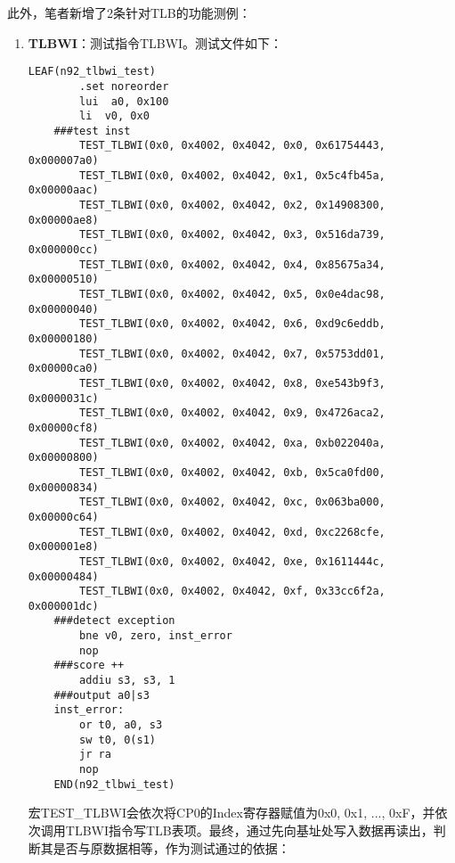 此外，笔者新增了2条针对TLB的功能测例：

\begin{enumerate}
    \item {\bf TLBWI}：测试指令TLBWI。测试文件如下：

    \begin{lstlisting}[caption={n92\_tlbwi.S}, emph={TEST\_TLBWI}]
    LEAF(n92_tlbwi_test)
        .set noreorder
        lui  a0, 0x100
        li  v0, 0x0
    ###test inst
        TEST_TLBWI(0x0, 0x4002, 0x4042, 0x0, 0x61754443, 0x000007a0)
        TEST_TLBWI(0x0, 0x4002, 0x4042, 0x1, 0x5c4fb45a, 0x00000aac)
        TEST_TLBWI(0x0, 0x4002, 0x4042, 0x2, 0x14908300, 0x00000ae8)
        TEST_TLBWI(0x0, 0x4002, 0x4042, 0x3, 0x516da739, 0x000000cc)
        TEST_TLBWI(0x0, 0x4002, 0x4042, 0x4, 0x85675a34, 0x00000510)
        TEST_TLBWI(0x0, 0x4002, 0x4042, 0x5, 0x0e4dac98, 0x00000040)
        TEST_TLBWI(0x0, 0x4002, 0x4042, 0x6, 0xd9c6eddb, 0x00000180)
        TEST_TLBWI(0x0, 0x4002, 0x4042, 0x7, 0x5753dd01, 0x00000ca0)
        TEST_TLBWI(0x0, 0x4002, 0x4042, 0x8, 0xe543b9f3, 0x0000031c)
        TEST_TLBWI(0x0, 0x4002, 0x4042, 0x9, 0x4726aca2, 0x00000cf8)
        TEST_TLBWI(0x0, 0x4002, 0x4042, 0xa, 0xb022040a, 0x00000800)
        TEST_TLBWI(0x0, 0x4002, 0x4042, 0xb, 0x5ca0fd00, 0x00000834)
        TEST_TLBWI(0x0, 0x4002, 0x4042, 0xc, 0x063ba000, 0x00000c64)
        TEST_TLBWI(0x0, 0x4002, 0x4042, 0xd, 0xc2268cfe, 0x000001e8)
        TEST_TLBWI(0x0, 0x4002, 0x4042, 0xe, 0x1611444c, 0x00000484)
        TEST_TLBWI(0x0, 0x4002, 0x4042, 0xf, 0x33cc6f2a, 0x000001dc)
    ###detect exception
        bne v0, zero, inst_error
        nop
    ###score ++
        addiu s3, s3, 1
    ###output a0|s3
    inst_error:
        or t0, a0, s3
        sw t0, 0(s1)
        jr ra
        nop
    END(n92_tlbwi_test)
    \end{lstlisting}

    宏TEST\_TLBWI会依次将CP0的Index寄存器赋值为0x0, 0x1, ..., 0xF，并依次调用TLBWI指令写TLB表项。最终，通过先向基址处写入数据再读出，判断其是否与原数据相等，作为测试通过的依据：


\end{enumerate}
